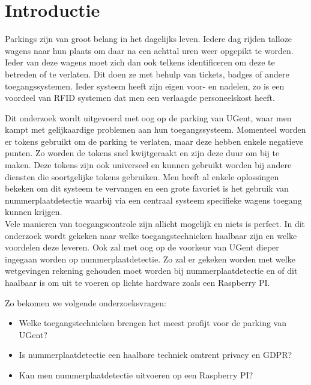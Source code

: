 
\section{Introductie} %
\label{sec:introductie}

Parkings zijn van groot belang in het dagelijks leven. Iedere dag rijden talloze wagens naar hun plaats om daar na een achttal uren weer opgepikt te worden. Ieder van deze wagens moet zich dan ook telkens identificeren om deze te betreden of te verlaten. Dit doen ze met behulp van tickets, badges of andere toegangssystemen. Ieder systeem heeft zijn eigen voor- en nadelen, zo is een voordeel van RFID systemen dat men een verlaagde personeelskost heeft. \autocite{pala2007smart}

Dit onderzoek wordt uitgevoerd met oog op de parking van UGent, waar men kampt met gelijkaardige problemen aan hun toegangssysteem. Momenteel worden er tokens gebruikt om de parking te verlaten, maar deze hebben enkele negatieve punten. Zo worden de tokens snel kwijtgeraakt en zijn deze duur om bij te maken. Deze tokens zijn ook universeel en kunnen gebruikt worden bij andere diensten die soortgelijke tokens gebruiken. Men heeft al enkele oplossingen bekeken om dit systeem te vervangen en een grote favoriet is het gebruik van nummerplaatdetectie waarbij via een centraal systeem specifieke wagens toegang kunnen krijgen.
\\
Vele manieren van toegangscontrole zijn allicht mogelijk en niets is perfect. In dit onderzoek wordt gekeken naar welke toegangstechnieken haalbaar zijn en welke voordelen deze leveren. Ook zal met oog op de voorkeur van UGent dieper ingegaan worden op nummerplaatdetectie. Zo zal er gekeken worden met welke wetgevingen rekening gehouden moet worden bij nummerplaatdetectie en of dit haalbaar is om uit te voeren op lichte hardware zoals een Raspberry PI.

Zo bekomen we volgende onderzoeksvragen:
\begin{itemize}
  \item Welke toegangstechnieken brengen het meest profijt voor de parking van UGent?
  \item Is nummerplaatdetectie een haalbare techniek omtrent privacy en GDPR?
  \item Kan men nummerplaatdetectie uitvoeren op een Raspberry PI?
\end{itemize}

